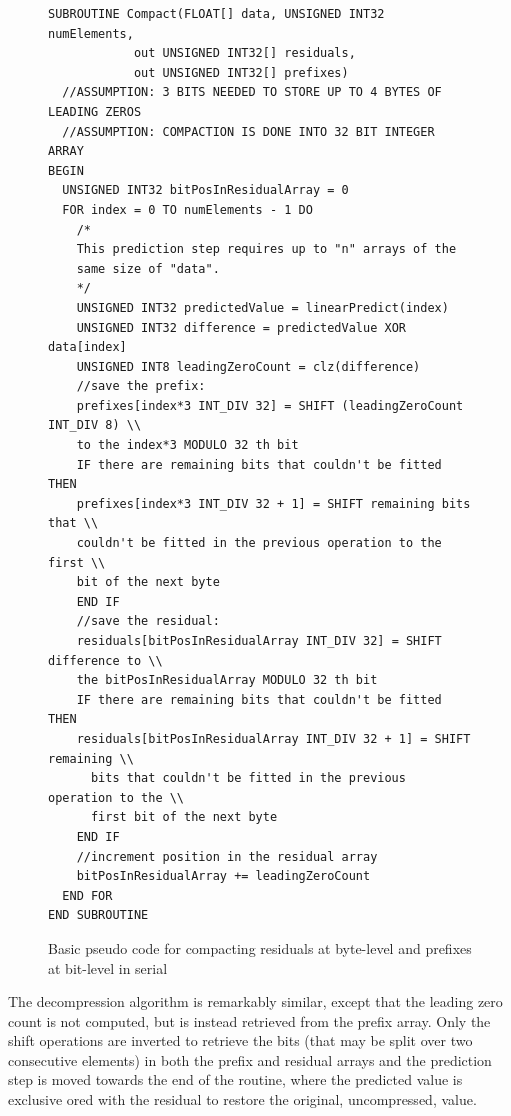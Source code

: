 \begin{figure}[ht!]
\begin{mdframed}
\begin{lstlisting}
SUBROUTINE Compact(FLOAT[] data, UNSIGNED INT32 numElements, 
		    out UNSIGNED INT32[] residuals, 
		    out UNSIGNED INT32[] prefixes)
  //ASSUMPTION: 3 BITS NEEDED TO STORE UP TO 4 BYTES OF LEADING ZEROS
  //ASSUMPTION: COMPACTION IS DONE INTO 32 BIT INTEGER ARRAY
BEGIN
  UNSIGNED INT32 bitPosInResidualArray = 0
  FOR index = 0 TO numElements - 1 DO
    /*
    This prediction step requires up to "n" arrays of the 
    same size of "data".
    */
    UNSIGNED INT32 predictedValue = linearPredict(index) 
    UNSIGNED INT32 difference = predictedValue XOR data[index]
    UNSIGNED INT8 leadingZeroCount = clz(difference)
    //save the prefix:
    prefixes[index*3 INT_DIV 32] = SHIFT (leadingZeroCount INT_DIV 8) \\
	to the index*3 MODULO 32 th bit
    IF there are remaining bits that couldn't be fitted THEN
	prefixes[index*3 INT_DIV 32 + 1] = SHIFT remaining bits that \\ 
	couldn't be fitted in the previous operation to the first \\
	bit of the next byte
    END IF
    //save the residual:
    residuals[bitPosInResidualArray INT_DIV 32] = SHIFT difference to \\
	the bitPosInResidualArray MODULO 32 th bit
    IF there are remaining bits that couldn't be fitted THEN
	residuals[bitPosInResidualArray INT_DIV 32 + 1] = SHIFT remaining \\
	  bits that couldn't be fitted in the previous operation to the \\
	  first bit of the next byte
    END IF  
    //increment position in the residual array
    bitPosInResidualArray += leadingZeroCount
  END FOR
END SUBROUTINE 
\end{lstlisting}
\caption[Compaction algorithm pseudo code]{Basic pseudo code for compacting residuals at byte-level and prefixes at bit-level in serial}
\label{BASIC_PSEUDO}
\end{mdframed}
\end{figure}

The decompression algorithm is remarkably similar, except that the leading zero count is not computed, but is instead retrieved from the prefix array. Only the shift
operations are inverted to retrieve the bits (that may be split over two consecutive elements) in both the prefix and residual arrays and the prediction step is moved towards
the end of the routine, where the predicted value is exclusive ored with the residual to restore the original, uncompressed, value.
